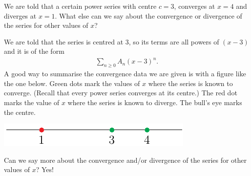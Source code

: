 \begin{eg}\label{eg:SRintervalA}
We are told that a certain power series with centre $c=3$, converges
at $x=4$ and diverges at $x=1$. What else can we say about the
convergence or divergence of the series for other values of $x$?


We are told that the series is centred at $3$, so its terms are all powers of $(x-3)$ and it is of the form
\begin{align*}
\sum_{n \geq 0} A_n (x-3)^n.
\end{align*}
A good way to summarise the convergence data we are given is with
a figure like the one below. Green dots mark the values of $x$ where
the series is known to converge. (Recall that every power series
converges at its centre.)  The red dot marks the value of $x$ where
the series is known to diverge. The bull's eye marks the centre.
\begin{efig}
\begin{center}
     \includegraphics{convDiv.pdf}
\end{center}
\end{efig}
Can we say more about the convergence and/or divergence of the series for other values of $x$? Yes!


\end{eg}
